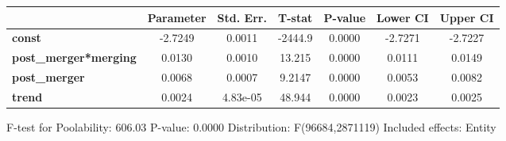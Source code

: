 \documentclass{report}
\begin{document}
\begin{center}
\begin{tabular}{lcccccc}
                              & \textbf{Parameter} & \textbf{Std. Err.} & \textbf{T-stat} & \textbf{P-value} & \textbf{Lower CI} & \textbf{Upper CI}  \\
\midrule
\textbf{const}                &      -2.7249       &       0.0011       &     -2444.9     &      0.0000      &      -2.7271      &      -2.7227       \\
\textbf{post\_merger*merging} &       0.0130       &       0.0010       &      13.215     &      0.0000      &       0.0111      &       0.0149       \\
\textbf{post\_merger}         &       0.0068       &       0.0007       &      9.2147     &      0.0000      &       0.0053      &       0.0082       \\
\textbf{trend}                &       0.0024       &      4.83e-05      &      48.944     &      0.0000      &       0.0023      &       0.0025       \\
\bottomrule
\end{tabular}
\end{center}

F-test for Poolability: 606.03 \newline
 P-value: 0.0000 \newline
 Distribution: F(96684,2871119) \newline
  \newline
 Included effects: Entity
\end{document}
